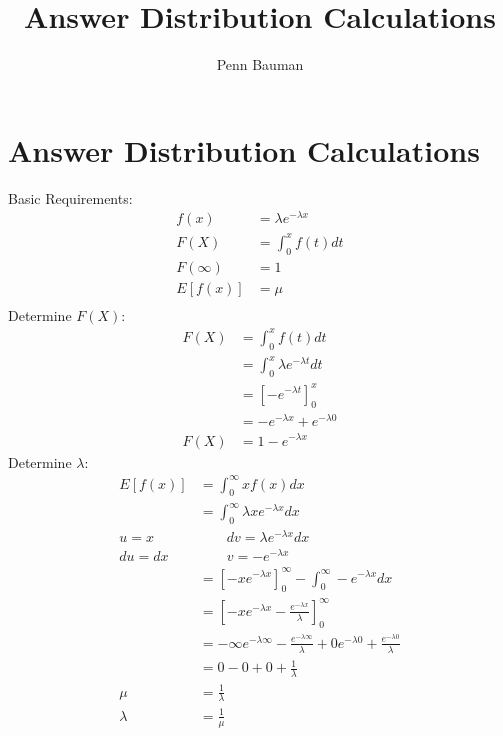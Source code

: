 \documentclass[12pt]{article}
\author{Penn Bauman}
\title{Answer Distribution Calculations}
\begin{document}
\section{Answer Distribution Calculations}

Basic Requirements:
\begin{align*}
	f(x) &= \lambda e^{-\lambda x} \\
	F(X) &= \int_{0}^{x} f(t) dt \\
	F(\infty) &= 1 \\
	E[f(x)] &= \mu \\
\end{align*}
Determine $F(X)$:
\begin{align*}
	F(X) &= \int_{0}^{x} f(t) dt \\
		&= \int_{0}^{x} \lambda e^{-\lambda t} dt \\
		&= \left[-e^{-\lambda t}\right]_{0}^{x} \\
		&= -e^{-\lambda x} + e^{-\lambda 0} \\
	F(X) &= 1 - e^{-\lambda x}
\end{align*}
Determine $\lambda$:
\begin{align*}
	E[f(x)] &= \int_{0}^{\infty} x f(x) dx \\
		&= \int_{0}^{\infty} \lambda x e^{-\lambda x} dx \\
	u = x & \ \ \ \ \ \ \ \ \ dv = \lambda e^{-\lambda x} dx \\
	du  =  dx & \ \ \ \ \ \ \ \ \ v = -e^{-\lambda x} \\
		&= \left[-x e^{-\lambda x}\right]_{0}^{\infty} - \int_{0}^{\infty} - e^{-\lambda x} dx \\
		&= \left[-x e^{-\lambda x} - \frac{e^{-\lambda x}}{\lambda}\right]_{0}^{\infty} \\
		&= -\infty e^{-\lambda \infty} - \frac{e^{-\lambda \infty}}{\lambda}
		+ 0 e^{-\lambda 0} + \frac{e^{-\lambda 0}}{\lambda} \\
		&= 0 - 0 + 0 + \frac{1}{\lambda} \\
	\mu &= \frac{1}{\lambda} \\
	\lambda &= \frac{1}{\mu} \\
\end{align*}
\end{document}
